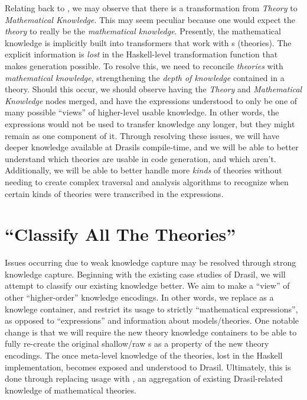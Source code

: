 
Relating back to , we may observe that there is a
transformation from \textit{Theory} to \textit{Mathematical Knowledge}. This may
seem peculiar because one would expect the \textit{theory} to really be the
\textit{mathematical knowledge}. Presently, the mathematical knowledge is
implicitly built into transformers that work with \RelationConcept{}s
(theories). The explicit information is \textit{lost} in the Haskell-level
transformation function that makes generation possible. To resolve this, we need
to reconcile \textit{theories} with \textit{mathematical knowledge},
strengthening the \textit{depth of knowledge} contained in a theory. Should this
occur, we should observe  having the
\textit{Theory} and \textit{Mathematical Knowledge} nodes merged, and have the
expressions understood to only be one of many possible ``views'' of higher-level
usable knowledge. In other words, the expressions would not be used to transfer
knowledge any longer, but they might remain as one component of it. Through
resolving these issues, we will have deeper knowledge available at Drasils
compile-time, and we will be able to better understand which theories are usable
in code generation, and which aren't. Additionally, we will be able to better
handle more \textit{kinds} of theories without needing to create complex
traversal and analysis algorithms to recognize when certain kinds of theories
were transcribed in the expressions.

\section{``Classify All The Theories''}

Issues occurring due to weak knowledge capture may be resolved through strong
knowledge capture. Beginning with the existing case studies of Drasil, we will
attempt to classify our existing knowledge better. We aim to make
\RelationConcept{} a ``view'' of other ``higher-order'' knowledge encodings. In other
words, we replace \Expr{} as a knowlege container, and restrict its usage to
strictly ``mathematical expressions'', as opposed to ``expressions'' and
information about models/theories. One notable change is that we will require
the new theory knowledge containers to be able to fully re-create the original
shallow/raw \Expr{}s as a property of the new theory encodings. The once
meta-level knowledge of the theories, lost in the Haskell implementation,
becomes exposed and understood to Drasil. Ultimately, this is done through
replacing \RelationConcept{} usage with \ModelKind{}, an aggregation of existing
Drasil-related knowledge of mathematical theories.

